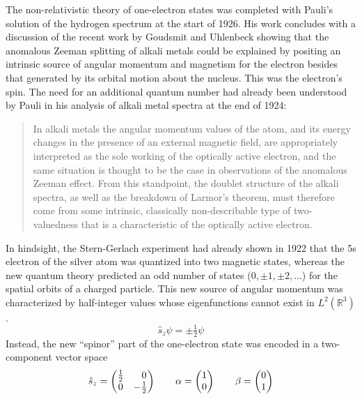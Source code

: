 The non-relativistic theory of one-electron states was completed with Pauli's
solution of the hydrogen spectrum at the start of 1926.\cite{Pauli:1926p336}
His work concludes with a discussion of the recent work by Goudsmit and
Uhlenbeck\cite{Uhlenbeck:1925p953} showing that the anomalous Zeeman splitting
of alkali metals could be explained by positing an intrinsic source of angular
momentum and magnetism for the electron besides that generated by its orbital
motion about the nucleus.
This was the electron's spin.
The need for an additional quantum number had already been understood by Pauli
in his analysis of alkali metal spectra at the end of 1924:
\begin{quote}
    In alkali metals the angular momentum values of the atom, and its energy
    changes in the presence of an external magnetic field, are appropriately
    interpreted as the sole working of the optically active electron, and the
    same situation is thought to be the case in observations of the anomalous
    Zeeman effect.
    From this standpoint, the doublet structure of the alkali
    spectra, as well as the breakdown of Larmor's theorem, must
    therefore come from some intrinsic, classically non-describable
    type of two-valuedness that is a characteristic of the optically
    active electron.\cite{Pauli:1925p373}
\end{quote}
In hindsight, the Stern-Gerlach experiment\cite{Gerlach:1922p349} had already
shown in 1922 that the 5s electron of the silver atom was quantized into two
magnetic states, whereas the new quantum theory predicted an odd number of
states (\(0, \pm1, \pm2, \dots\)) for the spatial orbits of a charged particle.
This new source of angular momentum was characterized by half-integer values
whose eigenfunctions cannot exist in \(L^2(\mathbb{R}^3)\).
\begin{equation}
    \hat{s}_z
    \psi
    =
    \pm
    \tfrac{1}{2}
    \psi
\end{equation}
Instead, the new ``spinor'' part of the one-electron state was encoded in a
two-component vector space
\begin{equation}
    \hat{s}_z
    =
    \begin{pmatrix}
        \tfrac{1}{2} & \hphantom{+}0 \\
        0 & -\tfrac{1}{2}
    \end{pmatrix}
    \qquad
    \alpha
    =
    \begin{pmatrix}
        1 \\ 0
    \end{pmatrix}
    \qquad
    \beta
    =
    \begin{pmatrix}
        0 \\ 1
    \end{pmatrix}
\end{equation}
